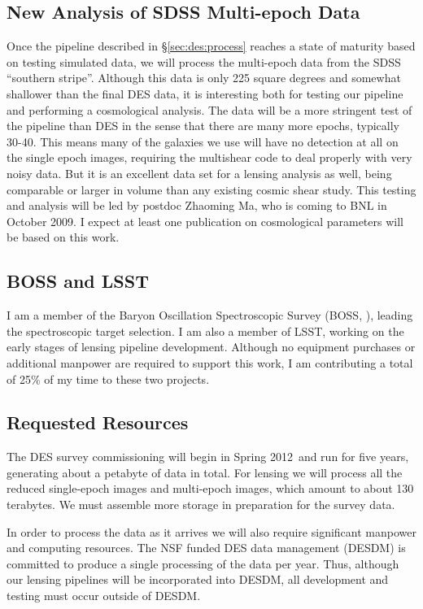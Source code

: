 \documentclass[12pt]{article}
\newcommand{\firstlight}{Spring 2012}
\begin{document}
\subsection{New Analysis of SDSS Multi-epoch Data} \label{sec:sdssnew}

Once the pipeline described in \S \ref{sec:des:process} reaches a state of
maturity based on testing simulated data, we will process the multi-epoch data
from the SDSS ``southern stripe''.  Although this data is only 225 square
degrees and somewhat shallower than the final DES data, it is interesting both
for testing our pipeline and performing a cosmological analysis.  The data will
be a more stringent test of the pipeline than DES in the sense that there are
many more epochs, typically 30-40.  This means many of the galaxies we use will
have no detection at all on the single epoch images, requiring the multishear
code to deal properly with very noisy data.  But it is an excellent data set
for a lensing analysis as well, being comparable or larger in volume than any
existing cosmic shear study.  This testing and analysis will be led by postdoc
Zhaoming Ma, who is coming to BNL in October 2009.  I expect at least one
publication on cosmological parameters will be based on this work.

\subsection{BOSS and LSST}

I am a member of the Baryon Oscillation Spectroscopic Survey (BOSS,
\cite{BossWhitePaper}), leading the spectroscopic target selection.  I am also
a member of LSST, working on the early stages of lensing pipeline development.
Although no equipment purchases or additional manpower are required to support
this work, I am contributing a total of 25\% of my time to these two projects.

\subsection{Requested Resources}

The DES survey commissioning will begin in \firstlight\ and run for five years,
generating about a petabyte of data in total.  For lensing we will process all
the reduced single-epoch images and multi-epoch images, which amount to about
130 terabytes.  We must assemble more storage in preparation for the survey
data.

In order to process the data as it arrives we will also require significant
manpower and computing resources.  The NSF funded DES data management (DESDM)
is committed to produce a single processing of the data per year.  Thus,
although our lensing pipelines will be incorporated into DESDM, all development
and testing must occur outside of DESDM.  
\end{document}
